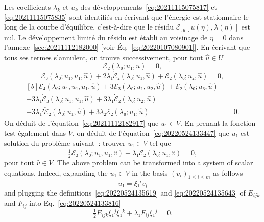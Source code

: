 \documentclass[12pt, final]{scrartcl}
\theoremstyle{definition}
\begin{document}
Les coefficients \(λ_k\) et \(u_k\) des développements~\eqref{eq:20211115075817}
et \eqref{eq:20211115075835} sont identifiés en écrivant que l'énergie est
stationnaire le long de la courbe d'équilibre, c'est-à-dire que le résidu
\(ℰ_{, u} [u(η), λ(η)]\) est nul. Le développement limité du résidu est établi
au voisinage de \(η = 0\) dans l'annexe~\ref{sec:20211112182000} [voir
Éq.~\eqref{eq:20220107080901}]. En écrivant que tous ses termes s'annulent, on
trouve successivement, pour tout \(\hat{u}∈U\)
\begin{equation}
  \label{eq:20211112182917}
  ℰ₂(λ₀; u₁, \hat{u}) = 0,
\end{equation}
\begin{equation}
  \label{eq:20220524133447}
  ℰ₃(λ₀; u₁, u₁, \hat{u}) + 2λ₁\dot{ℰ}₂(λ₀; u₁, \hat{u}) + ℰ₂(λ₀; u₂, \hat{u}) = 0,
\end{equation}
\begin{equation}
  \label{eq:res3}
  \begin{aligned}[b]
    ℰ₄(λ₀; u₁, u₁, u₁, \hat{u}) + 3ℰ₃(λ₀; u₁, u₂, \hat{u}) + ℰ₂(λ₀; u₃, \hat{u})&\\
    + 3λ₁\dot{ℰ}₃(λ₀; u₁, u₁, \hat{u}) + 3λ₁\dot{ℰ}₂(λ₀;  u₂, \hat{u})&\\
    + 3λ₁²\ddot{ℰ}₂(λ₀; u₁, \hat{u}) + 3λ₂\dot{ℰ}₂(λ₀; u₁, \hat{u}) & = 0.
  \end{aligned}
\end{equation}
On déduit de l'équation~\eqref{eq:20211112182917} que \(u₁∈V\). En prenant la
fonction test également dans \(V\), on déduit de
l'équation~\eqref{eq:20220524133447} que \(u₁\) est solution du problème
suivant~: trouver \(u₁∈V\) tel que
\begin{equation}
  \label{eq:20220524133816}
  \tfrac{1}{2} ℰ₃(λ₀; u₁, u₁, \hat{v}) + λ₁\dot{ℰ}₂(λ₀; u₁, \hat{v}) = 0,
\end{equation}
pour tout \(\hat{v}∈V\). The above problem can be transformed into a system of
scalar equations. Indeed, expanding the \(u₁∈V\) in the basis
\((v_i)_{1 ≤ i ≤ m}\) as follows
\begin{equation}
  \label{eq:20220524133944}
  u₁ = ξ₁^i v_i
\end{equation}
and plugging the definitions~\eqref{eq:20220524135619} and
\eqref{eq:20220524135643} of \(E_{ijk}\) and \(F_{ij}\) into
Eq.~\eqref{eq:20220524133816}
\begin{equation}
  \label{eq:20220524135036}
  \tfrac{1}{2} E_{ijk} ξ₁^j ξ₁^k + λ₁ F_{ij} ξ₁^j = 0.
\end{equation}
\end{document}
